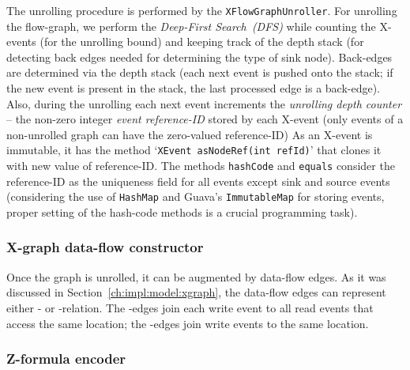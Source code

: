 The unrolling procedure is performed by the \texttt{XFlowGraphUnroller}.
For unrolling the flow-graph, we perform the \textit{Deep-First Search~(DFS)} while counting the X-events (for the unrolling bound) and keeping track of the depth stack (for detecting back edges needed for determining the type of sink node).
Back-edges are determined via the depth stack (each next event is pushed onto the stack; if the new event is present in the stack, the last processed edge is a back-edge).
Also, during the unrolling each next event increments the \textit{unrolling depth counter} -- the non-zero integer \textit{event reference-ID} stored by each X-event (only events of a non-unrolled graph can have the zero-valued reference-ID)
As an X-event is immutable, it has the method `\lstinline{XEvent asNodeRef(int refId)}' that clones it with new value of reference-ID.
The methods \lstinline{hashCode} and \texttt{equals} consider the reference-ID as the uniqueness field for all events except sink and source events (considering the use of \texttt{HashMap} and Guava's \texttt{ImmutableMap} for storing events, proper setting of the hash-code methods is a crucial programming task).



\subsubsection{X-graph data-flow constructor}
\label{ch:impl:proc:x-df}

Once the graph is unrolled, it can be augmented by data-flow edges.
As it was discussed in Section~\ref{ch:impl:model:xgraph}, the data-flow edges can represent either \rf{}- or \co{}-relation.
The \rf{}-edges join each write event to all read events that access the same location; the \co{}-edges join write events to the same location.



\subsubsection{Z-formula encoder}
\label{ch:impl:proc:z-encoder}

